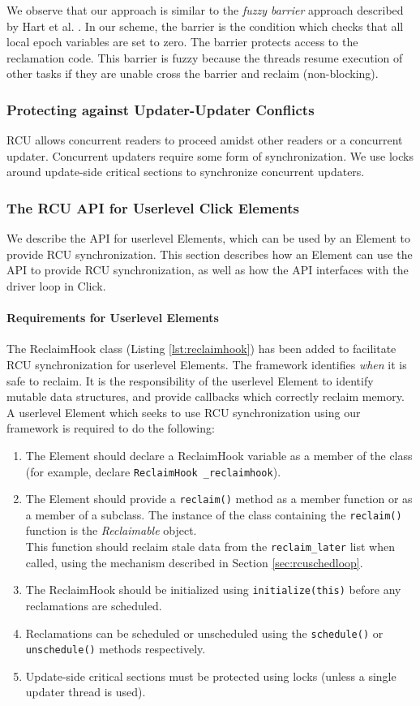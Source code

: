\documentclass[a4paper]{article}
\begin{document}
We observe that our approach is similar to the \emph{fuzzy barrier} approach described by Hart et al. \cite{hart}. In our scheme, the barrier is the condition which checks that all local epoch variables are set to zero. The barrier protects access to the reclamation code. This barrier is fuzzy because the threads resume execution of other tasks if they are unable cross the barrier and reclaim (non-blocking).

\subsubsection{Protecting against Updater-Updater Conflicts}
RCU allows concurrent readers to proceed amidst other readers or a concurrent updater. Concurrent updaters require some form of synchronization. We use locks around update-side critical sections to synchronize concurrent updaters.

\subsubsection{The RCU API for Userlevel Click Elements}
 We describe the API for userlevel Elements, which can be used by an Element to provide RCU synchronization. This section describes how an Element can use the API to provide RCU synchronization, as well as how the API interfaces with the driver loop in Click.
\paragraph{Requirements for Userlevel Elements}
 The ReclaimHook class (Listing \ref{lst:reclaimhook}) has been added to facilitate RCU synchronization for userlevel Elements. The framework identifies \emph{when} it is safe to reclaim. It is the responsibility of the userlevel Element to identify mutable data structures, and provide callbacks which correctly reclaim memory. A userlevel Element which seeks to use RCU synchronization using our framework is required to do the following:
\begin{enumerate}
\item The Element should declare a ReclaimHook variable as a member of the class (for example, declare \texttt{ReclaimHook \_reclaimhook}).
\item The Element should provide a \texttt{reclaim()} method as a member function or as a member of a subclass. The instance of the class containing the \texttt{reclaim()} function is the \emph{Reclaimable} object. \\ This function should reclaim stale data from the \texttt{reclaim\_later} list when called, using the mechanism described in Section \ref{sec:rcuschedloop}.
\item The ReclaimHook should be initialized using \texttt{initialize(this)} before any reclamations are scheduled.
\item Reclamations can be scheduled or unscheduled using the \texttt{schedule()} or \\\texttt{unschedule()} methods respectively.
\item Update-side critical sections must be protected using locks (unless a single updater thread is used).
\end{enumerate}
 
\end{document}
